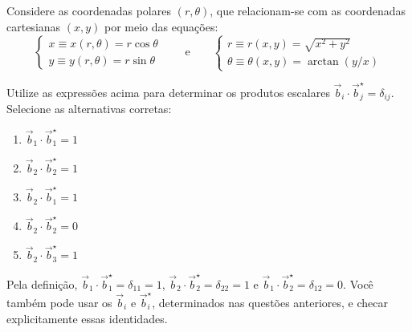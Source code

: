 \begin{question}
    Considere as coordenadas polares $(r,\theta)$, que relacionam-se com as coordenadas cartesianas $(x,y)$ por meio das equações:
    \begin{equation}
      \left\{
      \begin{matrix}
        x \equiv x(r, \theta) = r \cos\theta \\
        y \equiv y(r, \theta) = r \sin\theta
      \end{matrix}
      \right.
      \qquad\text{e}\qquad
      \left\{
      \begin{matrix}
        r \equiv r(x,y) = \sqrt{x^2 + y^2} \\
        \theta \equiv \theta(x,y) = \arctan\left(y/x\right)
      \end{matrix}
      \right.
    \end{equation}

    Utilize as expressões acima para determinar os produtos escalares $\vec b_i \cdot \vec b_j^{\star} = \delta_{ij}$.
    Selecione as alternativas corretas:
    \begin{enumerate}
      \item $\vec b_1 \cdot \vec b_1^{\star} = 1$ \rightanswer
      \item $\vec b_2 \cdot \vec b_2^{\star} = 1$ \rightanswer
      \item $\vec b_2 \cdot \vec b_1^{\star} = 1$
      \item $\vec b_2 \cdot \vec b_2^{\star} = 0$
      \item $\vec b_2 \cdot \vec b_3^{\star} = 1$
    \end{enumerate}

    \begin{solution}
      Pela definição, $\vec b_1 \cdot \vec b_1^{\star} = \delta_{11} = 1$, $\vec b_2 \cdot \vec b_2^{\star} = \delta_{22} = 1$ e $\vec b_1 \cdot \vec b_2^{\star} = \delta_{12} = 0$.
      Você também pode usar os $\vec b_i$ e $\vec b_i^\star$, determinados nas questões anteriores, e checar explicitamente essas identidades.
    \end{solution}
\end{question}